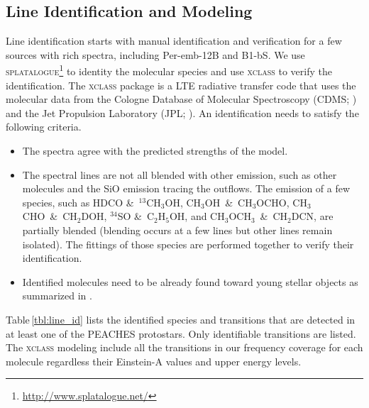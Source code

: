 \documentclass[twocolumn]{aastex62}
\newcommand{\methylformate}{\mbox{CH$_{3}$OCHO}}
\newcommand{\methanol}{\mbox{CH$_{3}$OH}}
\newcommand{\tmethanol}{\mbox{$^{13}$CH$_{3}$OH}}
\newcommand{\dmethanol}{\mbox{CH$_{2}$DOH}}
\newcommand{\dimethylether}{\mbox{CH$_{3}$OCH$_{3}$}}
\newcommand{\ethanol}{\mbox{C$_{2}$H$_{5}$OH}}
\newcommand{\acetaldehyde}{\mbox{CH$_{3}$CHO}}
\newcommand{\dmethylcyanide}{\mbox{CH$_{2}$DCN}}
\begin{document}
\subsection{Line Identification and Modeling}
\label{sec:modeling}
Line identification starts with manual identification and verification for a few sources with rich spectra, including Per-emb-12B and B1-bS.  We use \textsc{splatalogue}\footnote{\href{http://www.splatalogue.net/}{http://www.splatalogue.net/}} to identity the molecular species and use \textsc{xclass} \citep{2017A&A...598A...7M} to verify the identification.  The \textsc{xclass} package is a LTE radiative transfer code that uses the molecular data from the Cologne Database of Molecular Spectroscopy (CDMS; \citealt{2001A&A...370L..49M,2005JMoSt.742..215M,2016JMoSp.327...95E}) and the Jet Propulsion Laboratory (JPL; \citealt{1998JQSRT..60..883P}).  An identification needs to satisfy the following criteria.
\begin{itemize}
  \item The spectra agree with the predicted strengths of the model.
  \item The spectral lines are not all blended with other emission, such as other molecules and the SiO emission tracing the outflows.  The emission of a few species, such as HDCO \&\ \tmethanol, \methanol\ \&\ \methylformate, \acetaldehyde\ \&\ \dmethanol, $^{34}$SO \&\ \ethanol, and \dimethylether\ \&\ \dmethylcyanide, are partially blended (blending occurs at a few lines but other lines remain isolated).  The fittings of those species are performed together to verify their identification.
  \item Identified molecules need to be already found toward young stellar objects as summarized in \citet{2018ApJS..239...17M}.
\end{itemize}
Table\,\ref{tbl:line_id} lists the identified species and transitions that are detected in at least one of the PEACHES protostars.  Only identifiable transitions are listed.  The \textsc{xclass} modeling include all the transitions in our frequency coverage for each molecule regardless their Einstein-A values and upper energy levels.  
\end{document}
